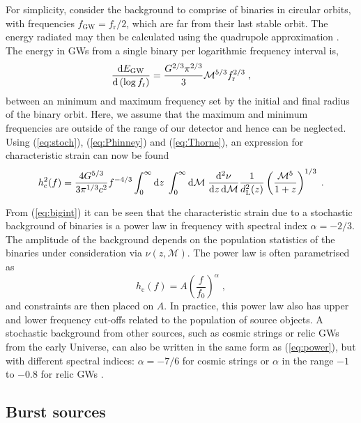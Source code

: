 For simplicity, consider the background to comprise of binaries in circular orbits, with frequencies $f_\mathrm{GW} =f_{\mathrm{r}}/2$, which are far from their last stable orbit. The energy radiated may then be calculated using the quadrupole approximation \citep{petersmathews1963}. The energy in GWs from a single binary per logarithmic frequency interval is, 
\begin{equation}\label{eq:Thorne}
\frac{\mathrm{d}E_{\mathrm{GW}}}{\mathrm{d}\left(\log f_{\mathrm{r}} \right)} = \frac{G^{2/3}\pi^{2/3}}{3}{\cal{M}}^{5/3}f_{\mathrm{r}}^{2/3} \; ,
\end{equation}
between an minimum and maximum frequency set by the initial and final radius of the binary orbit. Here, we assume that the maximum and minimum frequencies are outside of the range of our detector and hence can be neglected. Using (\ref{eq:stoch}), (\ref{eq:Phinney}) and (\ref{eq:Thorne}), an expression for characteristic strain can now be found \citep{SesanaVecchioColancino}
\begin{equation}\label{eq:bigint}
h_\mathrm{c}^{2}(f) = \frac{4G^{5/3}}{3\pi^{1/3}c^{2}}f^{-4/3}\int_{0}^{\infty}\mathrm{d}z\;\int_{0}^{\infty}\mathrm{d}{\cal{M}}\;\frac{\mathrm{d}^{2}\nu}{\mathrm{d}z\,\mathrm{d}{\mathcal{M}}}\frac{1}{d_{\mathrm{L}}^{2}(z)}\left( \frac{{\mathcal{M}}^{5}}{1+z} \right)^{1/3}\; .
\end{equation}

From (\ref{eq:bigint}) it can be seen that the characteristic strain due to a stochastic background of binaries is a power law in frequency with spectral index $\alpha=-2/3$. The amplitude of the background depends on the population statistics of the binaries under consideration via $\nu(z,{\mathcal{M}})$. The power law is often parametrised as
\begin{equation}\label{eq:power} 
h_\mathrm{c}(f) = A\left(\frac{f}{f_{0}}\right)^{\alpha}\; , 
\end{equation}
and constraints are then placed on $A$. In practice, this power law also has upper and lower frequency cut-offs related to the population of source objects. A stochastic background from other sources, such as cosmic strings or relic GWs from the early Universe, can also be written in the same form as (\ref{eq:power}), but with different spectral indices: $\alpha=-7/6$ for cosmic strings or $\alpha$ in the range $-1$ to $-0.8$ for relic GWs \citep{Jenet}.


\subsection{Burst sources}\label{sec:bursts}

